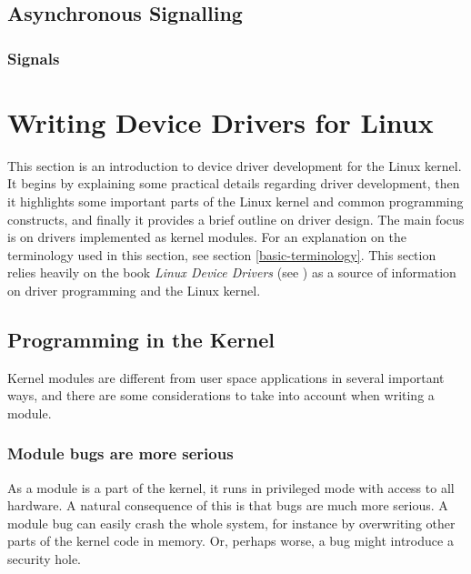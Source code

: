 \subsection{Asynchronous Signalling}\label{sec:asynchronous-signalling}

\subsubsection{Signals}



\section{Writing Device Drivers for Linux}\label{writing-device-drivers-for-linux}
This section is an introduction to device driver development for the Linux kernel. It begins by explaining some practical details regarding driver development, then it highlights some important parts of the Linux kernel and common programming constructs, and finally it provides a brief outline on driver design. The main focus is on drivers implemented as kernel modules. For an explanation on the terminology used in this section, see section \ref{basic-terminology}. This section relies heavily on the book \emph{Linux Device Drivers} (see \cite{linux-device-drivers}) as a source of information on driver programming and the Linux kernel.



\subsection{Programming in the Kernel}
Kernel modules are different from user space applications in several important ways, and there are some considerations to take into account when writing a module.

\subsubsection{Module bugs are more serious}
As a module is a part of the kernel, it runs in privileged mode with access to all hardware. A natural consequence of this is that bugs are much more serious. A module bug can easily crash the whole system, for instance by overwriting other parts of the kernel code in memory. Or, perhaps worse, a bug might introduce a security hole.

